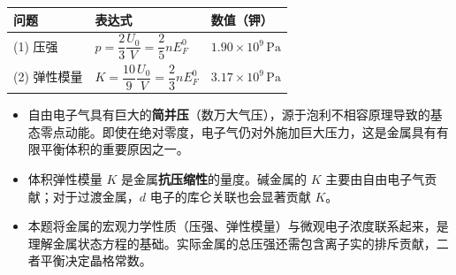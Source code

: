 \begin{formulabox}[答案汇总]
\begin{center}
\begin{tabular}{lll}
\toprule
\textbf{问题} & \textbf{表达式} & \textbf{数值（钾）} \\
\midrule
(1) 压强 & $p=\dfrac{2}{3}\dfrac{U_0}{V}=\dfrac{2}{5}nE_F^0$ & $1.90\times10^9\,\text{Pa}$ \\
(2) 弹性模量 & $K=\dfrac{10}{9}\dfrac{U_0}{V}=\dfrac{2}{3}nE_F^0$ & $3.17\times10^9\,\text{Pa}$ \\
\bottomrule
\end{tabular}
\end{center}
\end{formulabox}

\begin{insightbox}[物理图像]
\begin{itemize}
    \item 自由电子气具有巨大的\textbf{简并压}（数万大气压），源于泡利不相容原理导致的基态零点动能。即使在绝对零度，电子气仍对外施加巨大压力，这是金属具有有限平衡体积的重要原因之一。
    \item 体积弹性模量 $K$ 是金属\textbf{抗压缩性}的量度。碱金属的 $K$ 主要由自由电子气贡献；对于过渡金属，$d$ 电子的库仑关联也会显著贡献 $K$。
    \item 本题将金属的宏观力学性质（压强、弹性模量）与微观电子浓度联系起来，是理解金属状态方程的基础。实际金属的总压强还需包含离子实的排斥贡献，二者平衡决定晶格常数。
\end{itemize}
\end{insightbox}
